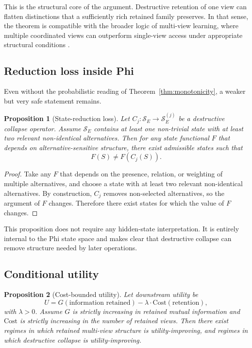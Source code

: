 \documentclass[11pt,a4paper]{article}
\newtheorem{proposition}{Proposition}
\begin{document}
This is the structural core of the argument. Destructive retention of one view can flatten distinctions that a sufficiently rich retained family preserves. In that sense, the theorem is compatible with the broader logic of multi-view learning, where multiple coordinated views can outperform single-view access under appropriate structural conditions \cite{balcan2005pac}.

\subsection{Reduction loss inside Phi}

Even without the probabilistic reading of Theorem~\ref{thm:monotonicity}, a weaker but very safe statement remains.

\begin{proposition}[State-reduction loss]
\label{prop:reduction}
Let $C_j : \mathcal{S}_E \to \mathcal{S}_E^{(j)}$ be a destructive collapse operator. Assume $\mathcal{S}_E$ contains at least one non-trivial state with at least two relevant non-identical alternatives. Then for any state functional $F$ that depends on alternative-sensitive structure, there exist admissible states such that
\begin{equation}
F(S) \neq F(C_j(S)).
\end{equation}
\end{proposition}

\begin{proof}
Take any $F$ that depends on the presence, relation, or weighting of multiple alternatives, and choose a state with at least two relevant non-identical alternatives. By construction, $C_j$ removes non-selected alternatives, so the argument of $F$ changes. Therefore there exist states for which the value of $F$ changes.
\end{proof}

This proposition does not require any hidden-state interpretation. It is entirely internal to the Phi state space and makes clear that destructive collapse can remove structure needed by later operations.

\subsection{Conditional utility}

\begin{proposition}[Cost-bounded utility]
\label{prop:utility}
Let downstream utility be
\begin{equation}
U = G(\text{information retained}) - \lambda \cdot \text{Cost}(\text{retention}),
\end{equation}
with $\lambda > 0$. Assume $G$ is strictly increasing in retained mutual information and $\text{Cost}$ is strictly increasing in the number of retained views. Then there exist regimes in which retained multi-view structure is utility-improving, and regimes in which destructive collapse is utility-improving.
\end{proposition}
\end{document}
